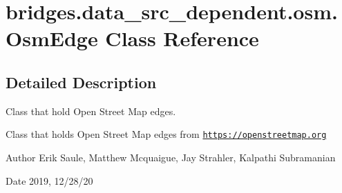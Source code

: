 \hypertarget{classbridges_1_1data__src__dependent_1_1osm_1_1_osm_edge}{}\section{bridges.\+data\+\_\+src\+\_\+dependent.\+osm.\+Osm\+Edge Class Reference}
\label{classbridges_1_1data__src__dependent_1_1osm_1_1_osm_edge}


\subsection{Detailed Description}
Class that hold Open Street Map edges. 

Class that holds Open Street Map edges from \href{https://openstreetmap.org}{\tt https\+://openstreetmap.\+org}

\begin{DoxyAuthor}{Author}
Erik Saule, Matthew Mcquaigue, Jay Strahler, Kalpathi Subramanian 
\end{DoxyAuthor}
\begin{DoxyDate}{Date}
2019, 12/28/20 
\end{DoxyDate}
